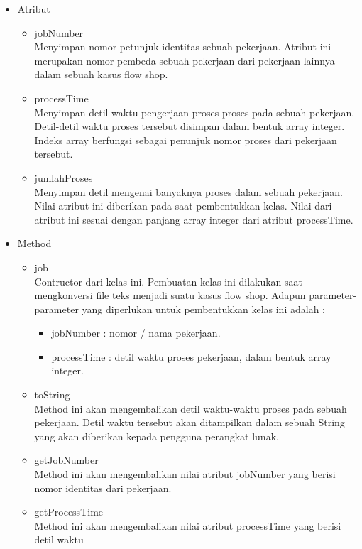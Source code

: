 \begin{itemize}
		\begin{itemize}
			\item Atribut 
			\begin{itemize}
				\item jobNumber \\
				Menyimpan nomor petunjuk identitas sebuah pekerjaan. Atribut ini merupakan
				nomor pembeda sebuah pekerjaan dari pekerjaan lainnya dalam sebuah kasus flow shop.
				\item processTime \\
				Menyimpan detil waktu pengerjaan proses-proses pada sebuah pekerjaan. Detil-detil
				waktu proses tersebut disimpan dalam bentuk array integer. Indeks array berfungsi
				sebagai penunjuk nomor proses dari pekerjaan tersebut.
				\item jumlahProses \\
				Menyimpan detil mengenai banyaknya proses dalam sebuah pekerjaan. Nilai atribut
				ini diberikan pada saat pembentukkan kelas. Nilai dari atribut ini sesuai dengan
				panjang array integer dari atribut processTime.
			\end{itemize}
			\item Method
			\begin{itemize}
				\item job \\
				Contructor dari kelas ini. Pembuatan kelas ini dilakukan saat mengkonversi file teks
				menjadi suatu kasus flow shop. Adapun parameter-parameter yang diperlukan
				untuk pembentukkan kelas ini adalah : 
				\begin{itemize}
					\item jobNumber : nomor / nama pekerjaan.
					\item processTime : detil waktu proses pekerjaan, dalam bentuk array integer.
				\end{itemize}
				\item toString\\
				Method ini akan mengembalikan detil waktu-waktu proses pada sebuah pekerjaan.
				Detil waktu tersebut akan ditampilkan dalam sebuah String yang akan diberikan
				kepada pengguna perangkat lunak.
				\item getJobNumber\\
				Method ini akan mengembalikan nilai atribut jobNumber yang berisi nomor identitas dari pekerjaan.
				\item getProcessTime\\
				Method ini akan mengembalikan nilai atribut processTime yang berisi detil waktu

\end{itemize}
\end{itemize}
\end{itemize}
